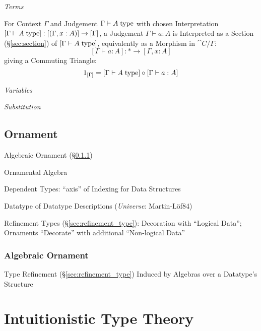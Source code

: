 \emph{Terms}

For Context $\Gamma$ and Judgement $\Gamma \vdash A\;\mathrm{type}$ with chosen
Interpretation $[\Gamma \vdash A\;\mathrm{type}] : [(\Gamma,x:A)] \rightarrow
[\Gamma]$, a Judgement $\Gamma \vdash a:A$ is Interpreted as a Section
(\S\ref{sec:section}) of $[\Gamma \vdash A\;\mathrm{type}]$, equivalently as a
Morphism in $\cat{C}/\Gamma$:
\[
  [\Gamma \vdash a:A]: * \rightarrow [\Gamma,x:A]
\]
giving a Commuting Triangle:
\[
  1_{[\Gamma]} = [\Gamma \vdash A\;\mathrm{type}] \circ [\Gamma \vdash a:A]
\]

\emph{Variables}

\emph{Substitution}



\subsection{Ornament}\label{sec:ornament}

\cite{mcbride13}

Algebraic Ornament (\S\ref{sec:algebraic_ornament})

Ornamental Algebra

Dependent Types: ``axis'' of Indexing for Data Structures

Datatype of Datatype Descriptions (\emph{Universe}: Martin-L\"of84)

Refinement Types (\S\ref{sec:refinement_type}): Decoration with
``Logical Data''; Ornaments ``Decorate'' with additional ``Non-logical
Data'' %



\subsubsection{Algebraic Ornament}\label{sec:algebraic_ornament}

Type Refinement (\S\ref{sec:refinement_type}) Induced by Algebras over
a Datatype's Structure



\section{Intuitionistic Type Theory}\label{sec:intuitionistic_type}

